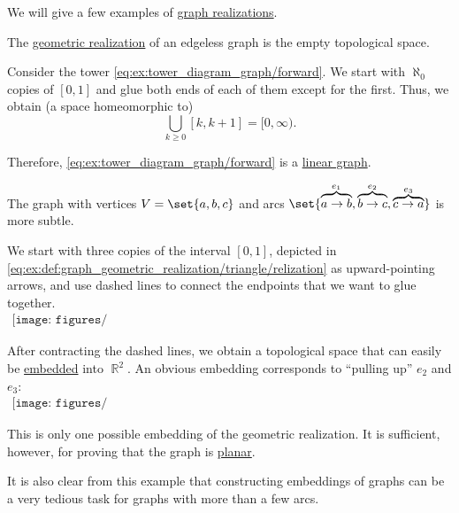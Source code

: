 \begin{example}\label{ex:def:graph_geometric_realization}
  We will give a few examples of \hyperref[def:graph_geometric_realization]{graph realizations}.

  \begin{thmenum}
     The \hyperref[def:graph_geometric_realization]{geometric realization} of an edgeless graph is the empty topological space.

     Consider the tower \eqref{eq:ex:tower_diagram_graph/forward}. We start with \( \aleph_0 \) copies of \( [0, 1] \) and glue both ends of each of them except for the first. Thus, we obtain (a space homeomorphic to)
    \begin{equation*}
      \bigcup_{k \geq 0} [k, k + 1] = [0, \infty).
    \end{equation*}

    Therefore, \eqref{eq:ex:tower_diagram_graph/forward} is a \hyperref[def:graph_geometric_realization/linear]{linear graph}.

     The graph with vertices \( V = \set{ a, b, c } \) and arcs \( \set{ \overbrace{a \to b}^{e_1}, \overbrace{b \to c}^{e_2}, \overbrace{c \to a}^{e_3} } \) is more subtle.

    We start with three copies of the interval \( [0, 1] \), depicted in \eqref{eq:ex:def:graph_geometric_realization/triangle/relization} as upward-pointing arrows, and use dashed lines to connect the endpoints that we want to glue together.
    \begin{equation}\label{eq:ex:def:graph_geometric_realization/triangle/relization}
      \begin{aligned}
        \texttt{[image: figures/eq\_\_ex\_\_def\_\_graph\_geometric\_realization\_\_triangle\_\_realization.pdf]}
      \end{aligned}
    \end{equation}

    After contracting the dashed lines, we obtain a topological space that can easily be \hyperref[def:graph_geometric_realization/embedding]{embedded} into \( \BbbR^2 \). An obvious embedding corresponds to \enquote{pulling up} \( e_2 \) and \( e_3 \):
    \begin{equation}\label{eq:ex:def:graph_geometric_realization/triangle/embedding}
      \begin{aligned}
        \texttt{[image: figures/eq\_\_ex\_\_def\_\_graph\_geometric\_realization\_\_triangle\_\_embedding.pdf]}
      \end{aligned}
    \end{equation}

    This is only one possible embedding of the geometric realization. It is sufficient, however, for proving that the graph is \hyperref[def:graph_geometric_realization/planar]{planar}.

    It is also clear from this example that constructing embeddings of graphs can be a very tedious task for graphs with more than a few arcs.
  \end{thmenum}
\end{example}
